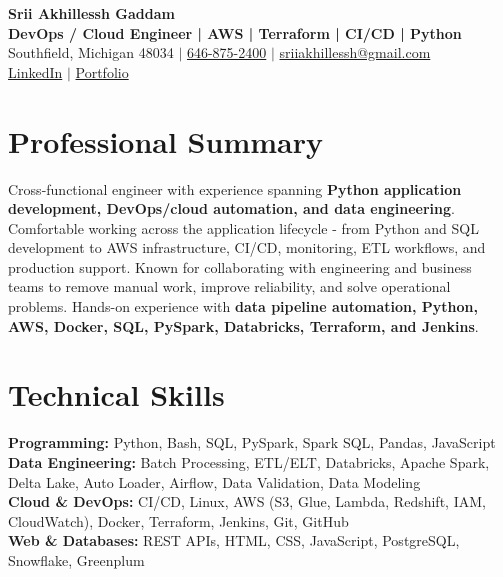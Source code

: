 \documentclass[letterpaper,10pt]{article}
\begin{document}
\fontsize{9.35pt}{10.45pt}\selectfont

\begin{center}
    {\LARGE \textbf{Srii Akhillessh Gaddam}} \\[-1pt]
    \textbf{DevOps / Cloud Engineer | AWS | Terraform | CI/CD | Python} \\[2pt]
    Southfield, Michigan 48034 $|$
    \href{tel:6468752400}{646-875-2400} $|$
    \href{mailto:sriiakhillessh@gmail.com}{sriiakhillessh@gmail.com} \\[1pt]
    \href{https://www.linkedin.com/in/srii-akhiilessh-gaddam-b48668191/}{LinkedIn} $|$
    \href{https://sriiakhillesshg.github.io/portfolio/}{Portfolio}
\end{center}
\vspace{-8pt}

\section{Professional Summary}
\small{Cross-functional engineer with experience spanning \textbf{Python application development, DevOps/cloud automation, and data engineering}. Comfortable working across the application lifecycle - from Python and SQL development to AWS infrastructure, CI/CD, monitoring, ETL workflows, and production support. Known for collaborating with engineering and business teams to remove manual work, improve reliability, and solve operational problems. Hands-on experience with \textbf{data pipeline automation, Python, AWS, Docker, SQL, PySpark, Databricks, Terraform, and Jenkins}.}

\section{Technical Skills}
\small{
\textbf{Programming:} Python, Bash, SQL, PySpark, Spark SQL, Pandas, JavaScript \\
\textbf{Data Engineering:} Batch Processing, ETL/ELT, Databricks, Apache Spark, Delta Lake, Auto Loader, Airflow, Data Validation, Data Modeling \\
\textbf{Cloud \& DevOps:} CI/CD, Linux, AWS (S3, Glue, Lambda, Redshift, IAM, CloudWatch), Docker, Terraform, Jenkins, Git, GitHub \\
\textbf{Web \& Databases:} REST APIs, HTML, CSS, JavaScript, PostgreSQL, Snowflake, Greenplum
}
\end{document}

